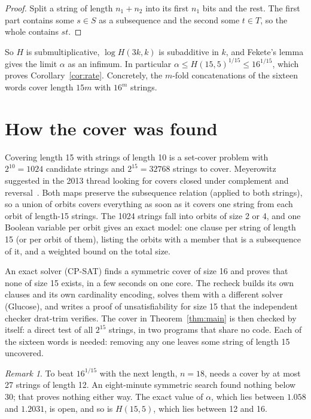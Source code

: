 \documentclass[11pt]{article}
\theoremstyle{remark}
\newtheorem*{remark}{Remark}
\begin{document}
\begin{proof}
Split a string of length $n_1+n_2$ into its first $n_1$ bits and the rest. The first part contains some $s\in S$
as a subsequence and the second some $t\in T$, so the whole contains $st$.
\end{proof}

So $H$ is submultiplicative, $\log H(3k,k)$ is subadditive in $k$, and Fekete's lemma gives the limit
$\alpha$ as an infimum. In particular $\alpha\le H(15,5)^{1/15}\le16^{1/15}$, which proves
Corollary~\ref{cor:rate}. Concretely, the $m$-fold concatenations of the sixteen words cover length $15m$ with
$16^m$ strings.

\section{How the cover was found}\label{sec:search}

Covering length 15 with strings of length 10 is a set-cover problem with $2^{10}=1024$ candidate strings and
$2^{15}=32768$ strings to cover. Meyerowitz suggested in the 2013 thread looking for covers closed under
complement and reversal~\cite{MO}. Both maps preserve the subsequence relation (applied to both strings), so a
union of orbits covers everything as soon as it covers one string from each orbit of length-15 strings. The
1024 strings fall into orbits of size 2 or 4, and one Boolean variable per orbit gives an exact model: one
clause per string of length 15 (or per orbit of them), listing the orbits with a member that is a subsequence of it, and a weighted
bound on the total size.

An exact solver (CP-SAT) finds a symmetric cover of size 16 and proves that none of size 15 exists, in a few
seconds on one core. The recheck builds its own clauses and its own cardinality encoding, solves them with
a different solver (Glucose), and writes a proof of unsatisfiability for size 15 that the independent checker
drat-trim verifies. The cover in Theorem~\ref{thm:main} is then checked by itself: a direct test of all $2^{15}$
strings, in two programs that share no code. Each of the sixteen words is needed: removing any one leaves some
string of length 15 uncovered.

\begin{remark}
To beat $16^{1/15}$ with the next length, $n=18$, needs a cover by at most 27 strings of length 12. An
eight-minute symmetric search found nothing below 30; that proves nothing either way. The exact value of
$\alpha$, which lies between $1.058$ and $1.2031$, is open, and so is $H(15,5)$, which lies between 12 and
16.
\end{remark}
\end{document}
